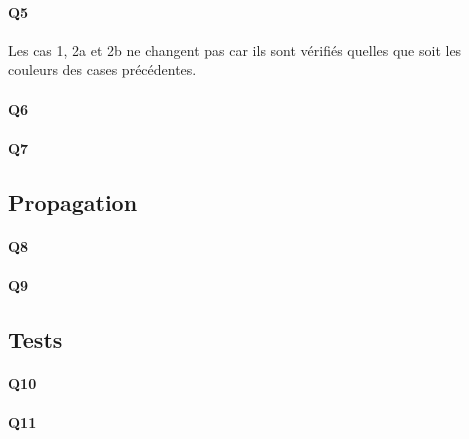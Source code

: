\documentclass[12pt]{article}
\begin{document}
			\paragraph{Q5}
				Les cas 1, 2a et 2b ne changent pas car ils sont vérifiés quelles que soit les couleurs des cases précédentes. \\
			\paragraph{Q6}
			\paragraph{Q7}
		
		\subsection{Propagation}
				
			
			\paragraph{Q8}
			\paragraph{Q9}
			
		\subsection{Tests}
			
			\paragraph{Q10}
			\paragraph{Q11}
						
\end{document}
